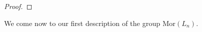 \documentclass{amsbook} %
\newcommand{\bigquotient}[2]{ \raisebox{0.75\height}{$#1$} \mkern-12mu\scalebox{2}{$\diagup$}\mkern-10mu \raisebox{-0.5\height}{$#2$} }
\numberwithin{section}{chapter}
\begin{document}
\begin{proof}

\end{proof}

We come now to our first description of the group $\mathrm{Mor}(L_n)$.
\end{document}
